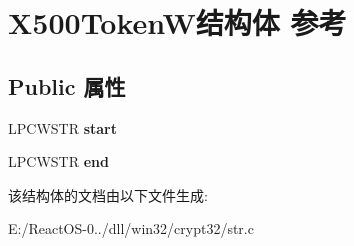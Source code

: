 \hypertarget{struct_x500_token_w}{}\section{X500\+Token\+W结构体 参考}
\label{struct_x500_token_w}
\subsection*{Public 属性}
\begin{DoxyCompactItemize}
\item 
\mbox{\label{struct_x500_token_w_a2f2cdfe7b81ac09a535c96a6287d2948}} 
L\+P\+C\+W\+S\+TR {\bfseries start}
\item 
\mbox{\label{struct_x500_token_w_ae32a44163e0b95eb40cf866daf80b84e}} 
L\+P\+C\+W\+S\+TR {\bfseries end}
\end{DoxyCompactItemize}


该结构体的文档由以下文件生成\+:\begin{DoxyCompactItemize}
\item 
E\+:/\+React\+O\+S-\/0../dll/win32/crypt32/str.\+c\end{DoxyCompactItemize}
